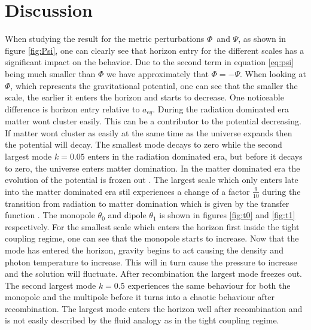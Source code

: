 \documentclass[onecolumn]{aastex62}
\begin{document}
\section{Discussion}\label{sec:discussion}
When studying the result for the metric perturbations $\Phi$ and $\Psi$, as shown in figure \ref{fig:Psi}, one can clearly see that horizon entry for the different scales has a significant impact on the behavior. Due to the second term in equation \ref{eq:psi} being much smaller than $\Phi$ we have approximately that $\Phi=-\Psi$. When looking at $\Phi$, which represents the gravitational potential, one can see that the smaller the scale, the earlier it enters the horizon and starts to decrease. One noticeable difference is horizon entry relative to $a_{eq}$. During the radiation dominated era matter wont cluster easily. This can be a contributor to the potential decreasing. If matter wont cluster as easily at the same time as the universe expands then the potential will decay. The smallest mode decays to zero while the second largest mode $k=0.05$ enters in the radiation dominated era, but before it decays to zero, the universe enters matter domination. In the matter dominated era the evolution of the potential is frozen out \citep[p.104]{Baumann:2020}. The largest scale which only enters late into the matter dominated era stil experiences a change of a factor $\frac{9}{10}$ during the transition from radiation to matter domination which is given by the transfer function \citep[p.182]{Dodelson:1282338}. The monopole $\theta_0$ and dipole $\theta_1$ is shown in figures \ref{fig:t0} and \ref{fig:t1} respectively. For the smallest scale which enters the horizon first inside the tight coupling regime, one can see that the monopole starts to increase. Now that the mode has entered the horizon, gravity begins to act causing the density and photon temperature to increase. This will in turn cause the pressure to increase and the solution will fluctuate. After recombination the largest mode freezes out. The second largest mode $k=0.5$ experiences the same behaviour for both the monopole and the multipole before it turns into a chaotic behaviour after recombination. The largest mode enters the horizon well after recombination and is not easily described by the fluid analogy as in the tight coupling regime.
\end{document}
